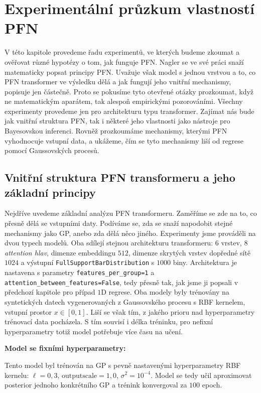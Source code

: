 \chapter{Experimentální průzkum vlastností PFN}
\label{chap:experimenty}

V této kapitole provedeme řadu experimentů, ve kterých budeme zkoumat a ověřovat různé hypotézy o tom, jak funguje PFN.
Nagler se ve své práci snaží matematicky popsat principy PFN.
Uvažuje však model s jednou vrstvou a to, co PFN transformer ve výsledku dělá a jak fungují jeho vnitřní mechanismy, popisuje jen částečně.
Proto se pokusíme tyto otevřené otázky prozkoumat, když ne matematickým aparátem, tak alespoň empirickými pozorováními.
Všechny experimenty provedeme jen pro architekturu typu transformer.
Zajímat nás bude jak vnitřní struktura PFN, tak i některé jeho vlastnosti jako nástroje pro Bayesovskou inferenci.
Rovněž prozkoumáme mechanismy, kterými PFN vyhodnocuje vstupní data, a ukážeme, čím se tyto mechanismy liší od regrese pomocí Gaussovských procesů.

\section{Vnitřní struktura PFN transformeru a jeho základní principy}
\label{sec:vnitrni-struktura}

Nejdříve uvedeme základní analýzu PFN transformeru.
Zaměříme se zde na to, co přesně dělá se vstupními daty.
Podíváme se, zda se snaží napodobit stejné mechanismy jako GP, anebo zda dělá něco jiného.
Experimenty jsme prováděli na dvou typech modelů.
Oba sdílejí stejnou architekturu transformeru: $6$ vrstev, $8$ \emph{attention hlav}, dimenze embeddingu $512$, dimenze skrytých vrstev dopředné sítě $1024$ a výstupní \texttt{FullSupportBarDistribution} s $1000$ biny.
Architektura je nastavena s parametry \lstinline|features_per_group=1| a \lstinline|attention_between_features=False|, tedy přesně tak, jak jsme ji popsali v předchozí kapitole pro případ $1$D regrese.
Oba modely byly trénovány na syntetických datech vygenerovaných z Gaussovského procesu s RBF kernelem, vstupní prostor $x \in [0, 1]$.
Liší se však tím, z jakého prioru nad hyperparametry trénovací data pocházela.
S tím souvisí i délka tréninku, pro nefixní hyperparametry totiž model potřebuje více času na učení.

\textbf{Model se fixními hyperparametry:} 

Tento model byl trénován na GP s pevně nastavenými hyperparametry RBF kernelu: $\ell = 0{,}3$, $\text{outputscale} = 1{,}0$, $\sigma^2 = 10^{-4}$.
Model se tedy učil aproximovat posterior jednoho konkrétního GP a trénink konvergoval za $100$ epoch.

